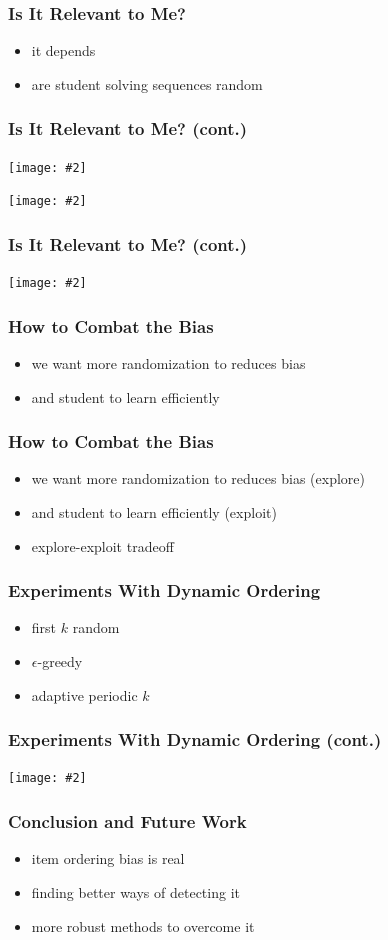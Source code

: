 \documentclass[bigger]{beamer}
\newcommand{\img}[2]{
  \begin{center}
    \texttt{[image: \#2]}
  \end{center}
}
\begin{document}
\begin{frame}
  \frametitle{Is It Relevant to Me?}
  \begin{itemize}
      \item it depends
      \item are student solving sequences random
  \end{itemize}
\end{frame}

\begin{frame}
\frametitle{Is It Relevant to Me? (cont.)}
\img{.9}{ordering-analysis-robomission}

\img{.9}{ordering-analysis-marble}
\end{frame}

\begin{frame}
\frametitle{Is It Relevant to Me? (cont.)}
  \img{1}{ordering-analysis-comparison-all}
\end{frame}

\begin{frame}
  \frametitle{How to Combat the Bias}
  \begin{itemize}
      \item we want more randomization to reduces bias
      \item and student to learn efficiently
  \end{itemize}
\end{frame}

\begin{frame}
\frametitle{How to Combat the Bias}
\begin{itemize}
    \item we want more randomization to reduces bias (explore)
    \item and student to learn efficiently (exploit)
    \item explore-exploit tradeoff
\end{itemize}
\end{frame}

\begin{frame}
  \frametitle{Experiments With Dynamic Ordering}
  \begin{itemize}
      \item first $k$ random
      \item $\epsilon$-greedy
      \item adaptive periodic $k$
  \end{itemize}
\end{frame}

\begin{frame}
\frametitle{Experiments With Dynamic Ordering (cont.)}
  \img{.9}{order-convergence-mean-correlation}
\end{frame}

\begin{frame}
  \frametitle{Conclusion and Future Work}

  \begin{itemize}
  \item item ordering bias is real
  \item finding better ways of detecting it
  \item more robust methods to overcome it
  \end{itemize}
\end{frame}
\end{document}
